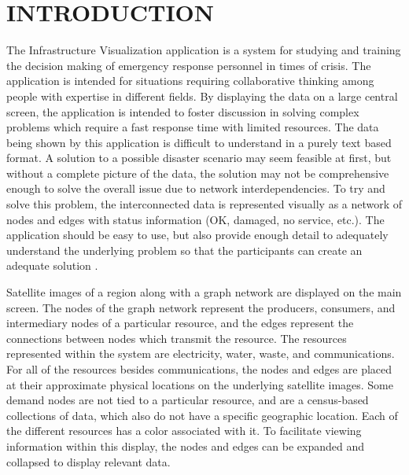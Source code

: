 
 
\chapter{INTRODUCTION}
\label{chapter:intro}

The Infrastructure Visualization application is a system for studying and training the decision making of emergency response personnel in times of crisis. The application is intended for situations requiring collaborative thinking among people with expertise in different fields. By displaying the data on a large central screen, the application is intended to foster discussion in solving complex problems which require a fast response time with limited resources. The data being shown by this application is difficult to understand in a
purely text based format. A solution to a possible disaster scenario may seem feasible at first, but without a complete picture of the data, the solution may not be comprehensive enough to solve the overall issue due to network interdependencies. To try and solve this problem, the interconnected data is represented visually as a network of nodes and edges with status information (OK, damaged, no service, etc.). The application should be easy to use, but also provide enough detail to adequately understand the underlying problem so that the participants can create an
adequate solution \cite{Mendonca2014}.

Satellite images of a region along with a graph network are displayed on the main screen. The nodes of the graph network represent the producers, consumers, and intermediary nodes of a particular resource, and the edges represent the connections between nodes which transmit the resource. The resources represented within the system are electricity, water, waste, and communications. For all of the resources besides communications, the nodes and edges are placed at their approximate
physical locations on the underlying satellite images. Some demand nodes are not tied to a particular resource, and are a census-based collections of data, which also do not have a specific geographic location. Each of the different resources has a color associated with it. To facilitate viewing information within this display, the nodes and edges can be expanded and collapsed to display relevant data. 

